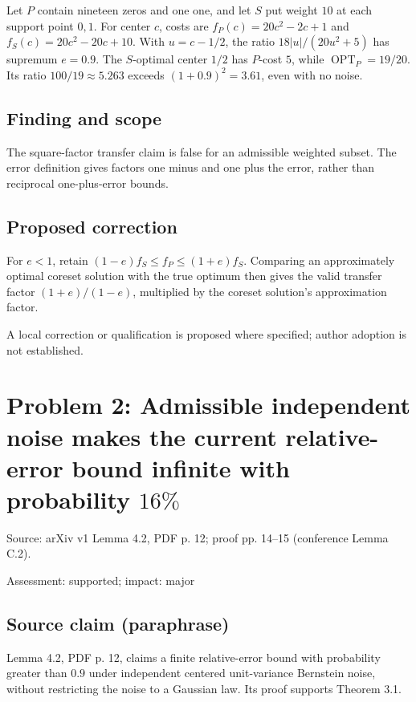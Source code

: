 \documentclass[11pt]{article}
\begin{document}
Let \(P\) contain nineteen zeros and one one, and let \(S\) put weight \(10\) at each support point \(0,1\). For center \(c\), costs are \(f_P(c)=20c^2-2c+1\) and \(f_S(c)=20c^2-20c+10\). With \(u=c-1/2\), the ratio \(18|u|/(20u^2+5)\) has supremum \(e=0.9\). The \(S\)-optimal center \(1/2\) has \(P\)-cost \(5\), while \(\operatorname{OPT}_P=19/20\). Its ratio \(100/19\approx5.263\) exceeds \((1+0.9)^2=3.61\), even with no noise.

\subsection*{Finding and scope}

The square-factor transfer claim is false for an admissible weighted subset. The error definition gives factors one minus and one plus the error, rather than reciprocal one-plus-error bounds.

\subsection*{Proposed correction}

For \(e<1\), retain \((1-e)f_S\le f_P\le(1+e)f_S\). Comparing an approximately optimal coreset solution with the true optimum then gives the valid transfer factor \((1+e)/(1-e)\), multiplied by the coreset solution's approximation factor.

A local correction or qualification is proposed where specified; author adoption is not established.

\section*{Problem 2: Admissible independent noise makes the current relative-error bound infinite with probability \(16\%\)}

Source: arXiv v1 Lemma 4.2, PDF p. 12; proof pp. 14–15 (conference Lemma C.2).

Assessment: supported; impact: major

\subsection*{Source claim (paraphrase)}

Lemma 4.2, PDF p. 12, claims a finite relative-error bound with probability greater than \(0.9\) under independent centered unit-variance Bernstein noise, without restricting the noise to a Gaussian law. Its proof supports Theorem 3.1.
\end{document}
